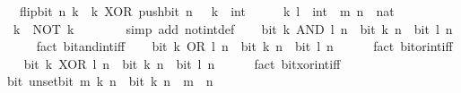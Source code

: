 \begin{isabellebody}
\ \ \ {\isacartoucheopen}flip{\isacharunderscore}{\kern0pt}bit\ n\ k\ {\isacharequal}{\kern0pt}\ k\ XOR\ push{\isacharunderscore}{\kern0pt}bit\ n\ {}{\isacartoucheclose}\ \ k\ {\isacharcolon}{\kern0pt}{\isacharcolon}{\kern0pt}\ int\isanewline
\isanewline
{}\isamarkupfalse%
%
\isadelimproof
\ %
\endisadelimproof
%
\isatagproof
{}\isamarkupfalse%
\isanewline
\ \ \isamarkupfalse%
\ k\ l\ {\isacharcolon}{\kern0pt}{\isacharcolon}{\kern0pt}\ int\ \ m\ n\ {\isacharcolon}{\kern0pt}{\isacharcolon}{\kern0pt}\ nat\isanewline
\ \ \isamarkupfalse%
\ {\isacartoucheopen}{\isacharminus}{\kern0pt}\ k\ {\isacharequal}{\kern0pt}\ NOT\ {\isacharparenleft}{\kern0pt}k\ {\isacharminus}{\kern0pt}\ {}{\isacharparenright}{\kern0pt}{\isacartoucheclose}\isanewline
\ \ \ \ \isamarkupfalse%
\ {\isacharparenleft}{\kern0pt}simp\ add{\isacharcolon}{\kern0pt}\ not{\isacharunderscore}{\kern0pt}int{\isacharunderscore}{\kern0pt}def{\isacharparenright}{\kern0pt}\isanewline
\ \ \isamarkupfalse%
\ {\isacartoucheopen}bit\ {\isacharparenleft}{\kern0pt}k\ AND\ l{\isacharparenright}{\kern0pt}\ n\ {\isasymlongleftrightarrow}\ bit\ k\ n\ {\isasymand}\ bit\ l\ n{\isacartoucheclose}\isanewline
\ \ \ \ \isamarkupfalse%
\ {\isacharparenleft}{\kern0pt}fact\ bit{\isacharunderscore}{\kern0pt}and{\isacharunderscore}{\kern0pt}int{\isacharunderscore}{\kern0pt}iff{\isacharparenright}{\kern0pt}\isanewline
\ \ \isamarkupfalse%
\ {\isacartoucheopen}bit\ {\isacharparenleft}{\kern0pt}k\ OR\ l{\isacharparenright}{\kern0pt}\ n\ {\isasymlongleftrightarrow}\ bit\ k\ n\ {\isasymor}\ bit\ l\ n{\isacartoucheclose}\isanewline
\ \ \ \ \isamarkupfalse%
\ {\isacharparenleft}{\kern0pt}fact\ bit{\isacharunderscore}{\kern0pt}or{\isacharunderscore}{\kern0pt}int{\isacharunderscore}{\kern0pt}iff{\isacharparenright}{\kern0pt}\isanewline
\ \ \isamarkupfalse%
\ {\isacartoucheopen}bit\ {\isacharparenleft}{\kern0pt}k\ XOR\ l{\isacharparenright}{\kern0pt}\ n\ {\isasymlongleftrightarrow}\ bit\ k\ n\ {\isasymnoteq}\ bit\ l\ n{\isacartoucheclose}\isanewline
\ \ \ \ \isamarkupfalse%
\ {\isacharparenleft}{\kern0pt}fact\ bit{\isacharunderscore}{\kern0pt}xor{\isacharunderscore}{\kern0pt}int{\isacharunderscore}{\kern0pt}iff{\isacharparenright}{\kern0pt}\isanewline
\ \ \isamarkupfalse%
\ {\isacartoucheopen}bit\ {\isacharparenleft}{\kern0pt}unset{\isacharunderscore}{\kern0pt}bit\ m\ k{\isacharparenright}{\kern0pt}\ n\ {\isasymlongleftrightarrow}\ bit\ k\ n\ {\isasymand}\ m\ {\isasymnoteq}\ n{\isacartoucheclose}\isanewline

\end{isabellebody}
